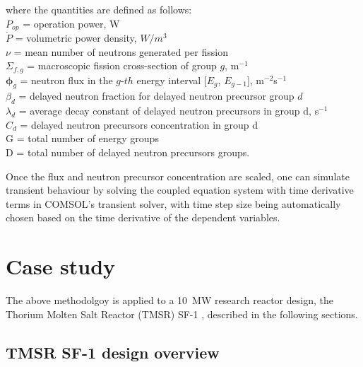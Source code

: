 \documentclass{elsarticle}
\newcommand{\flux}{{\ensuremath{\boldsymbol{\phi}}} }
\begin{document}
where the quantities are defined as follows:\\
$P_{op}$ = operation power, W\\
$\dot{P}$ = volumetric power density, $W/m^3$\\
$\nu$ = mean number of neutrons generated per fission\\
$\Sigma_{f,g}$ = macroscopic fission cross-section of group $g$, m$^{-1}$\\
  $\flux_{g}$ = neutron flux in the $g$-$th$ energy interval [$E_g$, $E_{g-1}$], m$^{-2}$s$^{-1}$
\\
  $\beta_d$ = delayed neutron fraction for delayed neutron precursor group $d$
\\
  $\lambda_d$ = average decay constant of delayed neutron precursors in group d, s$^{-1}$
\\
  $C_d$ = delayed neutron precursors concentration in group d
 \\
 G = total number of energy groups\\
 D = total number of delayed neutron precursors groups.


Once the flux and neutron precursor concentration are scaled, one can simulate transient behaviour by solving the coupled equation system with time derivative terms in COMSOL's transient solver, with time step size being automatically chosen based on the time derivative of the dependent variables.



\section{Case study}
\label{sec:res}
The above methodolgoy is applied to a 10~MW research reactor design, the Thorium Molten Salt Reactor (TMSR) SF-1 \cite{wang2014a}, described in the following sections.

\subsection{TMSR SF-1 design overview}
\end{document}

